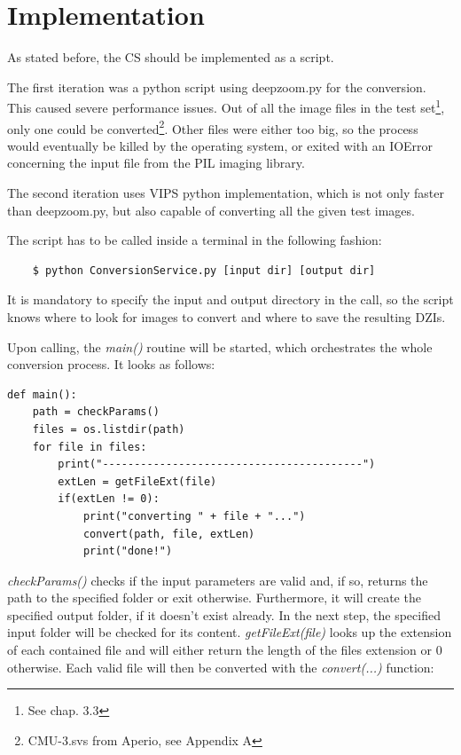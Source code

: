 \section{Implementation}

As stated before, the CS should be implemented as a script.

The first iteration was a python script using deepzoom.py for the conversion. This caused severe performance issues. Out of all the image files in the test set\footnote{See chap. 3.3}, only one could be converted\footnote{CMU-3.svs from Aperio, see Appendix A}. Other files were either too big, so the process would eventually be killed by the operating system, or exited with an IOError concerning the input file from the PIL imaging library.

The second iteration uses VIPS python implementation, which is not only faster than deepzoom.py, but also capable of converting all the given test images.

The script has to be called inside a terminal in the following fashion:

\begin{lstlisting}
	$ python ConversionService.py [input dir] [output dir]
\end{lstlisting}

It is mandatory to specify the input and output directory in the call, so the script knows where to look for images to convert and where to save the resulting DZIs.

Upon calling, the \emph{main()} routine will be started, which orchestrates the whole conversion process. It looks as follows:

\begin{lstlisting}[frame=single]
def main():
	path = checkParams()
	files = os.listdir(path)
	for file in files:
		print("-----------------------------------------")
		extLen = getFileExt(file)
		if(extLen != 0):
			print("converting " + file + "...")
			convert(path, file, extLen)
			print("done!")
\end{lstlisting}

\emph{checkParams()} checks if the input parameters are valid and, if so, returns the path to the specified folder or exit otherwise. Furthermore, it will create the specified output folder, if it doesn't exist already. In the next step, the specified input folder will be checked for its content. \emph{getFileExt(file)} looks up the extension of each contained file and will either return the length of the files extension or $0$ otherwise. Each valid file will then be converted with the \emph{convert(...)} function:

